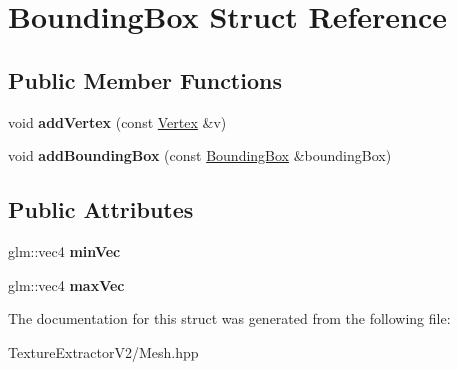 \hypertarget{struct_bounding_box}{}\section{Bounding\+Box Struct Reference}
\label{struct_bounding_box}
\subsection*{Public Member Functions}
\begin{DoxyCompactItemize}
\item 
\hypertarget{struct_bounding_box_af49243215eee1a4a355262d0b948505d}{}void {\bfseries add\+Vertex} (const \hyperlink{struct_vertex}{Vertex} \&v)\label{struct_bounding_box_af49243215eee1a4a355262d0b948505d}

\item 
\hypertarget{struct_bounding_box_ad0e27df4662e1023c3e015898e126465}{}void {\bfseries add\+Bounding\+Box} (const \hyperlink{struct_bounding_box}{Bounding\+Box} \&bounding\+Box)\label{struct_bounding_box_ad0e27df4662e1023c3e015898e126465}

\end{DoxyCompactItemize}
\subsection*{Public Attributes}
\begin{DoxyCompactItemize}
\item 
\hypertarget{struct_bounding_box_af0404f650a91d7c3212a2bd9db9ada56}{}glm\+::vec4 {\bfseries min\+Vec}\label{struct_bounding_box_af0404f650a91d7c3212a2bd9db9ada56}

\item 
\hypertarget{struct_bounding_box_a45c73eef0083449f657b8e25247123fd}{}glm\+::vec4 {\bfseries max\+Vec}\label{struct_bounding_box_a45c73eef0083449f657b8e25247123fd}

\end{DoxyCompactItemize}


The documentation for this struct was generated from the following file\+:\begin{DoxyCompactItemize}
\item 
Texture\+Extractor\+V2/Mesh.\+hpp\end{DoxyCompactItemize}
